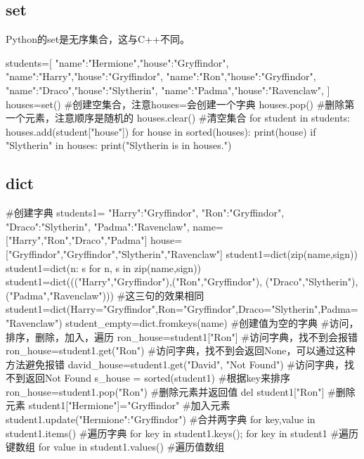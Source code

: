   \subsection{set}
    Python的set是无序集合，这与C++不同。
    \begin{codeblock}[language=python, caption={basic operation of set}]
      students=[
        {"name":"Hermione","house":"Gryffindor"},
        {"name":"Harry","house":"Gryffindor"},
        {"name":"Ron","house":"Gryffindor"},
        {"name":"Draco","house":"Slytherin"},
        {"name":"Padma","house":"Ravenclaw"},
      ]
      houses=set() #创建空集合，注意houses={}会创建一个字典
      houses.pop() #删除第一个元素，注意顺序是随机的
      houses.clear() #清空集合
      for student in students:
        houses.add(student["house"])
      for house in sorted(houses):
        print(house)
      if "Slytherin" in houses:
        print("Slytherin is in houses.")
    \end{codeblock}

  \subsection{dict}
    \begin{codeblock}[language=python, caption={basic operation of dictionary}]
      #创建字典
      students1={
        "Harry":"Gryffindor",
        "Ron":"Gryffindor",
        "Draco":"Slytherin",
        "Padma":"Ravenclaw",
      }
      name=["Harry","Ron","Draco","Padma"]
      house=["Gryffindor","Gryffindor","Slytherin","Ravenclaw"]
      student1=dict(zip(name,sign)) 
      student1=dict(n: s for n, s in zip(name,sign))
      student1=dict((("Harry","Gryffindor"),("Ron","Gryffindor"),
          ("Draco","Slytherin"),("Padma","Ravenclaw"))) #这三句的效果相同
      student1=dict(Harry="Gryffindor",Ron="Gryffindor",Draco="Slytherin",Padma="Ravenclaw")
      student_empty=dict.fromkeys(name) #创建值为空的字典
      #访问，排序，删除，加入，遍历
      ron_house=student1["Ron"] #访问字典，找不到会报错
      ron_house=student1.get("Ron") #访问字典，找不到会返回None，可以通过这种方法避免报错
      david_house=student1.get("David", "Not Found") #访问字典，找不到返回Not Found
      s_house = sorted(student1) #根据key来排序
      ron_house=student1.pop("Ron") #删除元素并返回值
      del student1["Ron"] #删除元素
      student1["Hermione"]="Gryffindor" #加入元素
      student1.update({"Hermione":"Gryffindor"}) #合并两字典
      for key,value in student1.items() #遍历字典
      for key in student1.keys(); for key in student1 #遍历键数组
      for value in student1.values() #遍历值数组
    \end{codeblock}

